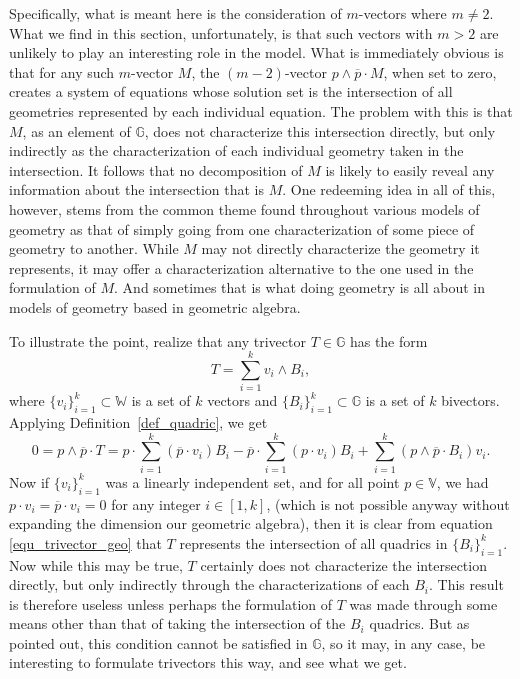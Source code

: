 \documentclass{ecgd-l}
\newcommand{\G}{\mathbb{G}}
\newcommand{\V}{\mathbb{V}}
\newcommand{\W}{\mathbb{W}}
\theoremstyle{definition}
\theoremstyle{remark}
\numberwithin{equation}{section}
\begin{document}
Specifically, what is meant here is the consideration of $m$-vectors where $m\neq 2$.
What we find in this section, unfortunately, is that such vectors with $m>2$
are unlikely to play an interesting role in the model.  What is immediately
obvious is that for any such $m$-vector $M$, the $(m-2)$-vector
$p\wedge\overline{p}\cdot M$, when set to zero, creates a system
of equations whose solution set is the intersection of all
geometries represented by each individual equation.  The problem with
this is that $M$, as an element of $\G$, does not characterize
this intersection directly, but only indirectly as the characterization
of each individual geometry taken in the intersection.
It follows that no decomposition of $M$ is likely to easily reveal any information
about the intersection that is $M$.  One redeeming idea in all of this, however,
stems from the common theme found throughout various models of geometry as
that of simply going from one characterization of some piece of geometry to another.
While $M$ may not directly characterize the geometry it represents,
it may offer a characterization alternative to the one used in
the formulation of $M$.  And sometimes that is what doing geometry is all about
in models of geometry based in geometric algebra.

To illustrate the point, realize that any trivector $T\in\G$ has the form
\begin{equation}
T = \sum_{i=1}^k v_i\wedge B_i,
\end{equation}
where $\{v_i\}_{i=1}^k\subset\W$ is a set of $k$ vectors and $\{B_i\}_{i=1}^k\subset\G$
is a set of $k$ bivectors.  Applying Definition~\ref{def_quadric}, we get
\begin{equation}\label{equ_trivector_geo}
0 = p\wedge\overline{p}\cdot T =
p\cdot\sum_{i=1}^k(\overline{p}\cdot v_i)B_i -
\overline{p}\cdot\sum_{i=1}^k(p\cdot v_i)B_i +
\sum_{i=1}^k(p\wedge\overline{p}\cdot B_i)v_i.
\end{equation}
Now if $\{v_i\}_{i=1}^k$ was a linearly independent set, and for all point $p\in\V$, we had $p\cdot v_i=\overline{p}\cdot v_i=0$
for any integer $i\in[1,k]$, (which is not possible anyway without expanding the dimension our geometric algebra), then it is clear
from equation \eqref{equ_trivector_geo} that $T$ represents the intersection of all quadrics in $\{B_i\}_{i=1}^k$.  Now while this
may be true, $T$ certainly does not characterize the intersection directly, but only indirectly through the characterizations
of each $B_i$.  This result is therefore useless unless perhaps the formulation of $T$ was made through some means other than that of
taking the intersection of the $B_i$ quadrics.  But as pointed out, this condition cannot be satisfied in $\G$, so it may, in any case,
be interesting to formulate trivectors this way, and see what we get.
\end{document}
